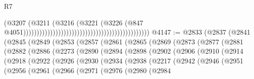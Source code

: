 \begin{lexlean}{R7}
\begin{coremodule}
                                                                                      (@3207
                                                                                        (@3211
                                                                                          (@3216
                                                                                            (@3221
                                                                                              (@3226
                                                                                                (@847
                                                                                                  @4051)))))))))))))))))))))))))))))))))))))))))))))))
@4147 := @2833
    (@2837
      (@2841
        (@2845
          (@2849
            (@2853
              (@2857
                (@2861
                  (@2865
                    (@2869
                      (@2873
                        (@2877
                          (@2881
                            (@2882
                              (@2886
                                (@2273
                                  (@2890
                                    (@2894
                                      (@2898
                                        (@2902
                                          (@2906
                                            (@2910
                                              (@2914
                                                (@2918
                                                  (@2922
                                                    (@2926
                                                      (@2930
                                                        (@2934
                                                          (@2938
                                                            (@2217
                                                              (@2942
                                                                (@2946
                                                                  (@2951
                                                                    (@2956
                                                                      (@2961
                                                                        (@2966
                                                                          (@2971
                                                                            (@2976
                                                                              (@2980
                                                                                (@2984

\end{coremodule}
\end{lexlean}
